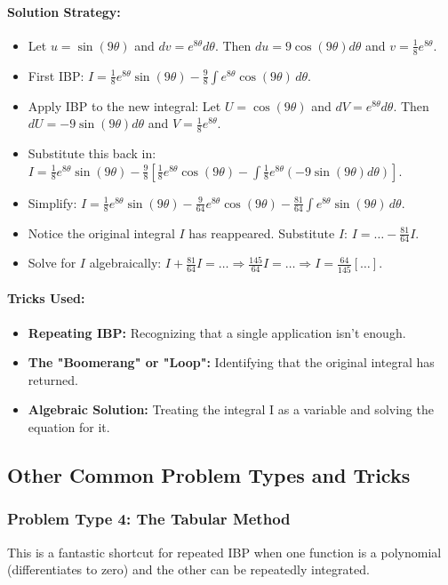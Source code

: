 \documentclass{article}
\begin{document}
\paragraph{Solution Strategy:}
\begin{itemize}
    \item Let $u = \sin(9\theta)$ and $dv = e^{8\theta}d\theta$. Then $du = 9\cos(9\theta)d\theta$ and $v=\frac{1}{8}e^{8\theta}$.
    \item First IBP: $ I = \frac{1}{8}e^{8\theta}\sin(9\theta) - \frac{9}{8}\int e^{8\theta}\cos(9\theta) \,d\theta $.
    \item Apply IBP to the new integral: Let $U=\cos(9\theta)$ and $dV=e^{8\theta}d\theta$. Then $dU = -9\sin(9\theta)d\theta$ and $V=\frac{1}{8}e^{8\theta}$.
    \item Substitute this back in: $I = \frac{1}{8}e^{8\theta}\sin(9\theta) - \frac{9}{8}\left[\frac{1}{8}e^{8\theta}\cos(9\theta) - \int \frac{1}{8}e^{8\theta}(-9\sin(9\theta)d\theta)\right]$.
    \item Simplify: $I = \frac{1}{8}e^{8\theta}\sin(9\theta) - \frac{9}{64}e^{8\theta}\cos(9\theta) - \frac{81}{64}\int e^{8\theta}\sin(9\theta) \,d\theta$.
    \item Notice the original integral $I$ has reappeared. Substitute $I$: $I = \dots - \frac{81}{64}I$.
    \item Solve for $I$ algebraically: $I + \frac{81}{64}I = \dots \Rightarrow \frac{145}{64}I = \dots \Rightarrow I = \frac{64}{145}[\dots]$.
\end{itemize}
\paragraph{Tricks Used:}
\begin{itemize}
    \item \textbf{Repeating IBP:} Recognizing that a single application isn't enough.
    \item \textbf{The "Boomerang" or "Loop":} Identifying that the original integral has returned.
    \item \textbf{Algebraic Solution:} Treating the integral I as a variable and solving the equation for it.
\end{itemize}

\subsection{Other Common Problem Types and Tricks}
\subsubsection{Problem Type 4: The Tabular Method}
This is a fantastic shortcut for repeated IBP when one function is a polynomial (differentiates to zero) and the other can be repeatedly integrated.
\end{document}
